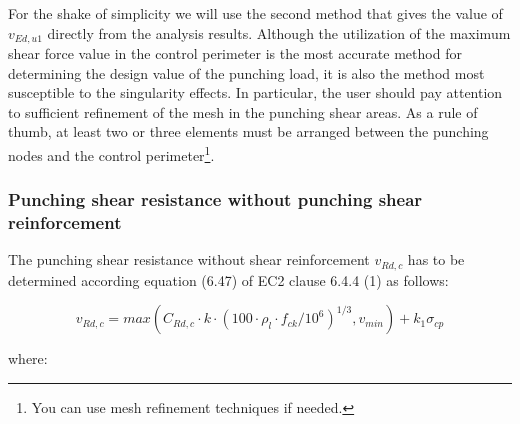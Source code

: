 For the shake of simplicity we will use the second method that gives the value of $v_{Ed,u1}$ directly from the analysis results. Although the utilization of the maximum shear force value in the control perimeter is the most accurate method for determining the design value of the punching load, it is also the method most susceptible to the singularity effects. In particular, the user should pay attention to sufficient refinement of the mesh in the punching shear areas. As a rule of thumb, at least two or three elements must be arranged between the punching nodes and the control perimeter\footnote{You can use mesh refinement techniques if needed.}.

\subsubsection{Punching shear resistance without punching shear reinforcement}
The punching shear resistance without shear reinforcement $v_{Rd,c}$ has to be determined according equation (6.47) of EC2 clause 6.4.4 (1) as follows:

\begin{equation}\label{eq_v_Rdc}
  v_{Rd,c}= max(C_{Rd,c} \cdot k \cdot (100 \cdot \rho_l \cdot f_{ck}/10^6)^{1/3}, v_{min}) + k_1 \sigma_{cp}
\end{equation}

\noindent where:

